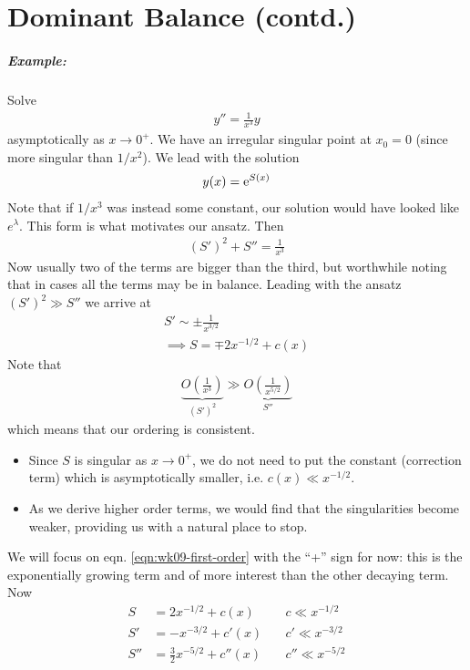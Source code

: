 \chapter{Dominant Balance (contd.)}

\paragraph{Example:} Solve
\begin{gather*}
	y'' = \frac{1}{x^3} y 
\end{gather*}
asymptotically as $x \rightarrow 0^{+}$. We have an irregular singular point at $x_0=0$ (since more singular than $1/x^2$). We lead with the solution
\begin{gather*}
	y(x) = \mathrm{e}^{S(x)}
\end{gather*}
Note that if $1/x^3$ was instead some constant, our solution would have looked like $e^\lambda$. This form is what motivates our ansatz. Then
\begin{align}\label{eqn:wk09-Seqn}
	(S')^2 + S'' = \frac{1}{x^3}
\end{align}
Now usually two of the terms are bigger than the third, but worthwhile noting that in cases all the terms may be in balance. Leading with the ansatz $(S')^2 \gg S''$ we arrive at
\begin{gather}
	S' \sim \pm \frac{1}{x^{3/2}} \nonumber \\
	\implies S = \mp 2x^{-1/2} + c(x) \label{eqn:wk09-first-order}
\end{gather}
Note that
\begin{gather*}
\underbrace{O\left(\frac{1}{x^3}\right)}_{(S')^2} \gg \underbrace{O\left(\frac{1}{x^{5/2}}\right)}_{S''}
\end{gather*}
which means that our ordering is consistent.
\begin{itemize}
	\item Since $S$ is singular as $x \rightarrow 0^{+}$, we do not need to put the constant (correction term) which is asymptotically smaller, i.e. $c(x) \ll x^{-1/2}$.
	\item As we derive higher order terms, we would find that the singularities become weaker, providing us with a natural place to stop.
\end{itemize} 
We will focus on eqn. \ref{eqn:wk09-first-order} with the ``+'' sign for now: this is the exponentially growing term and of more interest than the other decaying term. Now
\begin{align*}
	S &= 2x^{-1/2} + c(x) \quad &c \ll x^{-1/2}\\
	S' &= -x^{-3/2} + c'(x) \quad &c' \ll x^{-3/2}\\
	S'' &= \frac{3}{2}x^{-5/2} + c''(x) \quad &c'' \ll x^{-5/2}
\end{align*}
